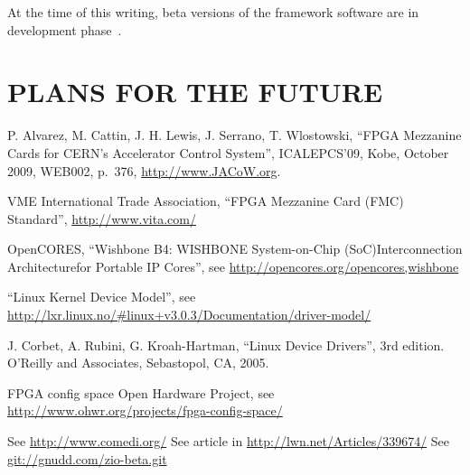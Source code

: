 \documentclass{JAC2003}
\begin{document}
At the time of this writing, beta versions of the framework software
are in development phase~\cite{zio-git}.

\section{PLANS FOR THE FUTURE}



\begin{thebibliography}{9}   %

P. Alvarez, M. Cattin, J. H. Lewis, J. Serrano, T. Wlostowski,
``FPGA Mezzanine Cards for CERN’s Accelerator Control System'',
ICALEPCS'09, Kobe, October 2009, WEB002, p.~376,
\url{http://www.JACoW.org}.

VME International Trade Association,
``FPGA Mezzanine Card (FMC) Standard'', \url{http://www.vita.com/}

OpenCORES,
``Wishbone B4: WISHBONE System-on-Chip (SoC)Interconnection
Architecturefor Portable IP Cores'',
see \url{http://opencores.org/opencores,wishbone}

``Linux Kernel Device Model'',
see \url{http://lxr.linux.no/#linux+v3.0.3/Documentation/driver-model/}

J. Corbet, A. Rubini, G. Kroah-Hartman, ``Linux Device Drivers'', 3rd
edition. O'Reilly and Associates, Sebastopol, CA, 2005.

 FPGA config space Open Hardware
Project, see
\url{http://www.ohwr.org/projects/fpga-config-space/}

 See \url{http://www.comedi.org/}
 See article in \url{http://lwn.net/Articles/339674/}
 See \url{git://gnudd.com/zio-beta.git}

\end{thebibliography}
\end{document}
